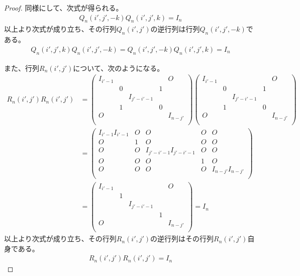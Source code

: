 \documentclass[dvipdfmx]{jsarticle}
\begin{document}
\begin{proof}
同様にして、次式が得られる。
\begin{align*}
Q_{n}\left( i',j', - k \right)Q_{n}\left( i',j',k \right) = I_{n}
\end{align*}
以上より次式が成り立ち、その行列$Q_{n}\left( i',j' \right)$の逆行列は行列$Q_{n}\left( i',j', - k \right)$である。
\begin{align*}
Q_{n}\left( i',j',k \right)Q_{n}\left( i',j', - k \right) = Q_{n}\left( i',j', - k \right)Q_{n}\left( i',j',k \right) = I_{n}
\end{align*}\par
また、行列$R_{n}\left( i',j' \right)$について、次のようになる。
\begin{align*}
R_{n}\left( i',j' \right)R_{n}\left( i',j' \right) &= \begin{pmatrix}
I_{i' - 1} & \  & \  & \  & O \\
\  & 0 & \  & 1 & \  \\
\  & \  & I_{j' - i' - 1} & \  & \  \\
\  & 1 & \  & 0 & \  \\
O & \  & \  & \  & I_{n - j'} \\
\end{pmatrix} \begin{pmatrix}
I_{i' - 1} & \  & \  & \  & O \\
\  & 0 & \  & 1 & \  \\
\  & \  & I_{j' - i' - 1} & \  & \  \\
\  & 1 & \  & 0 & \  \\
O & \  & \  & \  & I_{n - j'} \\
\end{pmatrix}\\
&= \begin{pmatrix}
I_{i' - 1}I_{i' - 1} & O & O & O & O \\
O & 1 & O & O & O \\
O & O & I_{j' - i' - 1}I_{j' - i' - 1} & O & O \\
O & O & O & 1 & O \\
O & O & O & O & I_{n - j'}I_{n - j'} \\
\end{pmatrix}\\
&= \begin{pmatrix}
I_{i' - 1} & \  & \  & \  & O \\
\  & 1 & \  & \  & \  \\
\  & \  & I_{j' - i' - 1} & \  & \  \\
\  & \  & \  & 1 & \  \\
O & \  & \  & \  & I_{n - j'} \\
\end{pmatrix} = I_{n}
\end{align*}
以上より次式が成り立ち、その行列$R_{n}\left( i',j' \right)$の逆行列はその行列$R_{n}\left( i',j' \right)$自身である。
\begin{align*}
R_{n}\left( i',j' \right)R_{n}\left( i',j' \right) = I_{n}
\end{align*}
\end{proof}
\end{document}
